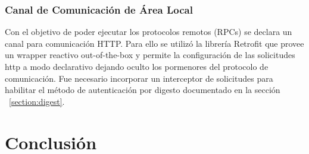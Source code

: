 \subsubsection{Canal de Comunicación de Área Local}
Con el objetivo de poder ejecutar los protocolos remotos (RPCs) se declara un canal para comunicación HTTP.
Para ello se utilizó la librería Retrofit que provee un wrapper reactivo out-of-the-box y permite la configuración de las
solicitudes http a modo declarativo dejando oculto los pormenores del protocolo de comunicación.
Fue necesario incorporar un interceptor de solicitudes para habilitar el método de autenticación por digesto documentado en la sección ~\ref{section:digest}.

\section{Conclusión}